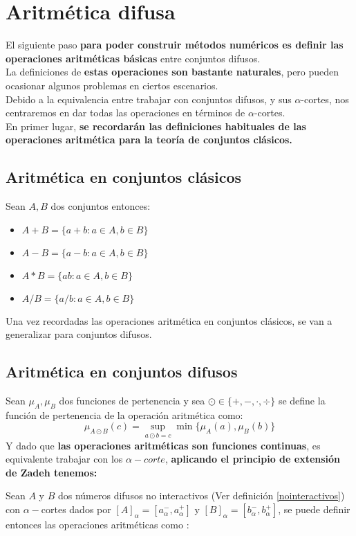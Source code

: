   \section{Aritmética difusa}
  El siguiente paso \textbf{para poder construir métodos numéricos es definir las operaciones aritméticas básicas} entre conjuntos difusos.\\
  La definiciones de \textbf{estas operaciones son bastante naturales}, pero pueden ocasionar algunos problemas en ciertos escenarios.\\
  Debido a la equivalencia entre trabajar con conjuntos difusos, y sus $\alpha$-cortes, nos centraremos en dar todas las operaciones en términos de $\alpha$-cortes.\\
  En primer lugar, \textbf{se recordarán las definiciones habituales de las operaciones aritmética para la teoría de conjuntos clásicos.}

  \subsection{Aritmética en conjuntos clásicos}
  Sean $A, B$ dos conjuntos entonces:
  \begin{itemize}
  \item $A+B=\{a+b : a \in A, b\in B\}$
  \item $A - B =\{a - b : a \in A, b\in B\}$
  \item $A * B =\{ab : a \in A, b\in B\}$
  \item $A / B =\{a/b : a \in A, b\in B\}$
  \end{itemize}

  Una vez recordadas las operaciones aritmética en conjuntos clásicos, se van a generalizar para conjuntos difusos.

  \subsection{Aritmética en conjuntos difusos}
  Sean $\mu_A, \mu_B$ dos funciones de pertenencia y sea $\odot \in \{+, -, \cdot, \div\}$ se define la función de pertenencia de la operación aritmética como:
  $$
  \mu_{A \odot B}(c) = \sup_{a \odot b = c} \min\{\mu_A(a), \mu_B(b)\}
  $$
  Y dado que \textbf{las operaciones aritméticas son funciones continuas}, es equivalente trabajar con los $\alpha-corte$, \textbf{aplicando el principio de extensión de Zadeh tenemos:}

  Sean $A$ y $B$ dos números difusos no interactivos (Ver definición \ref{nointeractivos}) con $\alpha-$cortes dados por $[A]_\alpha=[a_\alpha^-, a_\alpha^+]$ y $[B]_\alpha=[b_\alpha^-, b_\alpha^+]$, se puede definir entonces las operaciones aritméticas como \cite{fuzzyintro}:

